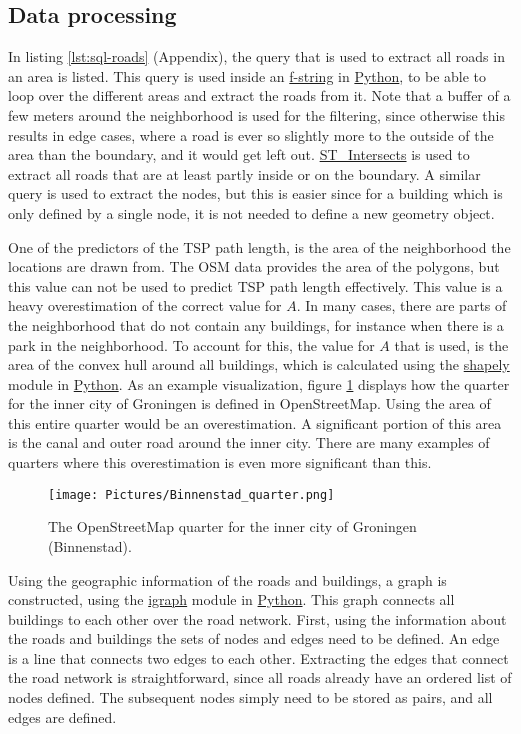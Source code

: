 \subsection{Data processing}
In listing \ref{lst:sql-roads} (Appendix), the query that is used to extract
all roads in an area is listed. This query is used inside an \url{f-string}
in \url{Python}, to be able to loop over the different areas and extract
the roads from it. Note that a buffer of a few meters around the neighborhood
is used for the filtering, since otherwise this results in edge cases,
where a road is ever so slightly more to the outside of the area than the boundary,
and it would get left out. \url{ST_Intersects} is used to extract all roads
that are at least partly inside or on the boundary. A similar query is used
to extract the nodes, but this is easier since for a building which is only
defined by a single node, it is not needed to define a new geometry object.

One of the predictors of the TSP path length, is the area of the neighborhood
the locations are drawn from. The OSM data provides the area of the polygons,
but this value can not be used to predict TSP path length effectively.
This value is a heavy overestimation of the correct value for $A$.
In many cases, there are parts of the neighborhood that do not contain
any buildings, for instance when there is a park in the neighborhood. To
account for this, the value for $A$ that is used, is the area of the convex
hull around all buildings, which is calculated using the \url{shapely}
module in \url{Python}. As an example visualization, figure \ref{fig:binnenstad_quarter} displays
how the quarter for the inner city of Groningen is defined in OpenStreetMap. Using the area of this
entire quarter would be an overestimation. A significant portion of this area is the canal and outer
road around the inner city. There are many examples of quarters where this overestimation is even
more significant than this.
\begin{figure}[H]
	\caption{The OpenStreetMap quarter for the inner city of Groningen (Binnenstad). \citep{openstreetmap}}
	\label{fig:binnenstad_quarter}
	\texttt{[image: Pictures/Binnenstad\_quarter.png]}
\end{figure}
Using the geographic information of the roads and buildings, a graph
is constructed, using the \url{igraph} module in \url{Python}. This graph
connects all buildings to each other over the road network. First, using the information about the
roads and buildings the sets of nodes and edges need to be defined. An edge is a line that connects
two edges to each other. Extracting the edges that connect the road network is straightforward,
since all roads already have an ordered list of nodes defined. The subsequent nodes simply need to
be stored as pairs, and all edges are defined.


